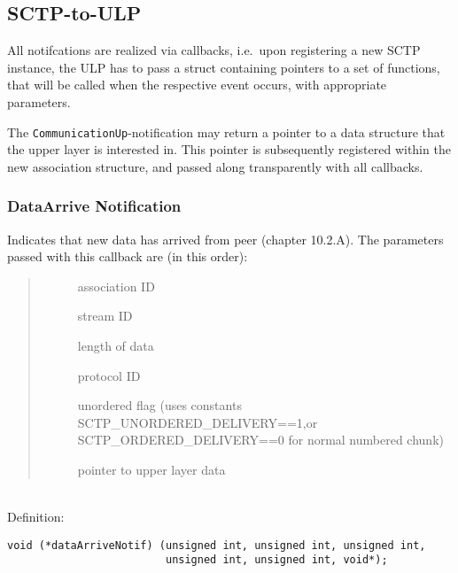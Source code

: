 \documentclass[10pt]{article}
\newcommand{\bv}{\vspace{0,1cm}\noindent \\ Definition:\footnotesize\begin{verbatim}}
\newcommand{\n}{\normalsize}
\newcommand{\no}{ }
\begin{document}
%%%%%%%%%%%%%%%%%%%%%%%%%%%%%%%%%%%%%%%%%%%%%%%%%%%%%%%%%%%%%%%%%%%%%%%%%%%%%%%%%%%%%%%%%%
\subsection{SCTP-to-ULP}
\label{sctp2ulp}
All notifcations are realized via callbacks, i.e.\ upon registering a new SCTP
instance, the ULP has to pass a struct containing pointers to a set of functions, 
that will be called when the respective event occurs, with appropriate
parameters. 

The \texttt{CommunicationUp}-notification may return a pointer
to a data structure that the upper layer is interested in. This pointer
is subsequently registered within the new association structure, and passed
along transparently with all callbacks.

\subsubsection{DataArrive Notification}
Indicates that new data has arrived from peer (chapter 10.2.A).
The parameters passed with this callback are (in this order):
\begin{quote} \begin{description} \no
 \item[] association ID
 \item[] stream ID
 \item[] length of data
 \item[] protocol ID
 \item[] unordered flag
(uses constants SCTP_UNORDERED_DELIVERY==1,or SCTP_ORDERED_DELIVERY==0 for normal
numbered chunk)
 \item[] pointer to upper layer data
\end{description} \end{quote}
\bv
void (*dataArriveNotif) (unsigned int, unsigned int, unsigned int,
                         unsigned int, unsigned int, void*);
\end{verbatim}\n
\end{document}
